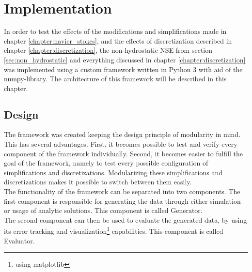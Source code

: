 
\chapter{Implementation}\label{chapter:implementation}
In order to test the effects of the modifications and simplifications made in chapter \ref{chapter:navier_stokes}, and the effects of discretization described in chapter \ref{chapter:discretization}, the non-hydrostatic NSE from section \ref{sec:non_hydrostatic} and everything discussed in chapter \ref{chapter:discretization} was implemented using a custom framework written in Python 3 with aid of the numpy-library.
The architecture of this framework will be described in this chapter.

\section{Design}
The framework was created keeping the design principle of modularity in mind.
This has several advantages.
First, it becomes possible to test and verify every component of the framework individually.
Second, it becomes easier to fulfill the goal of the framework, namely to test every possible configuration of simplifications and discretizations.
Modularizing these simplifications and discretizations makes it possible to switch between them easily.
\\
The functionality of the framework can be separated into two components. 
The first component is responsible for generating the data through either simulation or usage of analytic solutions.
This component is called Generator.
\\
The second component can then be used to evaluate the generated data, by using its error tracking and visualization\footnote{using matplotlib} capabilities.
This component is called Evaluator.

